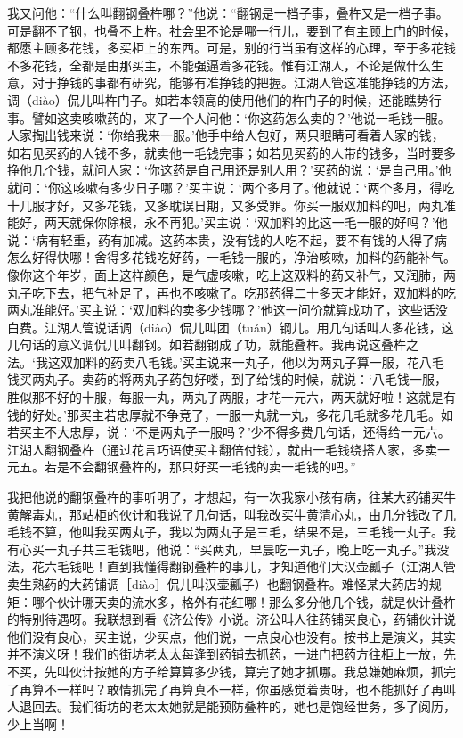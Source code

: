 \documentclass[12pt,UTF8]{ctexbook}
\begin{document}
我又问他：“什么叫翻钢叠杵哪？”他说：“翻钢是一档子事，叠杵又是一档子事。可是翻不了钢，也叠不上杵。社会里不论是哪一行儿，要到了有主顾上门的时候，都愿主顾多花钱，多买柜上的东西。可是，别的行当虽有这样的心理，至于多花钱不多花钱，全都是由那买主，不能强逼着多花钱。惟有江湖人，不论是做什么生意，对于挣钱的事都有研究，能够有准挣钱的把握。江湖人管这准能挣钱的方法，调（diào）侃儿叫杵门子。如若本领高的使用他们的杵门子的时候，还能瞧势行事。譬如这卖咳嗽药的，来了一个人问他：‘你这药怎么卖的？’他说一毛钱一服。人家掏出钱来说：‘你给我来一服。’他手中给人包好，两只眼睛可看着人家的钱，如若见买药的人钱不多，就卖他一毛钱完事；如若见买药的人带的钱多，当时要多挣他几个钱，就问人家：‘你这药是自己用还是别人用？’买药的说：‘是自己用。’他就问：‘你这咳嗽有多少日子哪？’买主说：‘两个多月了。’他就说：‘两个多月，得吃十几服才好，又多花钱，又多耽误日期，又多受罪。你买一服双加料的吧，两丸准能好，两天就保你除根，永不再犯。’买主说：‘双加料的比这一毛一服的好吗？’他说：‘病有轻重，药有加减。这药本贵，没有钱的人吃不起，要不有钱的人得了病怎么好得快哪！舍得多花钱吃好药，一毛钱一服的，净治咳嗽，加料的药能补气。像你这个年岁，面上这样颜色，是气虚咳嗽，吃上这双料的药又补气，又润肺，两丸子吃下去，把气补足了，再也不咳嗽了。吃那药得二十多天才能好，双加料的吃两丸准能好。’买主说：‘双加料的卖多少钱哪？’他这一问价就算成功了，这些话没白费。江湖人管说话调（diào）侃儿叫团（tuǎn）钢儿。用几句话叫人多花钱，这几句话的意义调侃儿叫翻钢。如若翻钢成了功，就能叠杵。我再说这叠杵之法。‘我这双加料的药卖八毛钱。’买主说来一丸子，他以为两丸子算一服，花八毛钱买两丸子。卖药的将两丸子药包好喽，到了给钱的时候，就说：‘八毛钱一服，胜似那不好的十服，每服一丸，两丸子两服，才花一元六，两天就好啦！这就是有钱的好处。’那买主若忠厚就不争竞了，一服一丸就一丸，多花几毛就多花几毛。如若买主不大忠厚，说：‘不是两丸子一服吗？’少不得多费几句话，还得给一元六。江湖人翻钢叠杵（通过花言巧语使买主翻倍付钱），就由一毛钱绕搭人家，多卖一元五。若是不会翻钢叠杵的，那只好买一毛钱的卖一毛钱的吧。”

我把他说的翻钢叠杵的事听明了，才想起，有一次我家小孩有病，往某大药铺买牛黄解毒丸，那站柜的伙计和我说了几句话，叫我改买牛黄清心丸，由几分钱改了几毛钱不算，他叫我买两丸子，我以为两丸子是三毛，结果不是，三毛钱一丸子。我有心买一丸子共三毛钱吧，他说：“买两丸，早晨吃一丸子，晚上吃一丸子。”我没法，花六毛钱吧！直到我懂得翻钢叠杵的事儿，才知道他们大汉壶瓤子（江湖人管卖生熟药的大药铺调［diào］侃儿叫汉壶瓤子）也翻钢叠杵。难怪某大药店的规矩：哪个伙计哪天卖的流水多，格外有花红哪！那么多分他几个钱，就是伙计叠杵的特别待遇呀。我联想到看《济公传》小说。济公叫人往药铺买良心，药铺伙计说他们没有良心，买主说，少买点，他们说，一点良心也没有。按书上是演义，其实并不演义呀！我们的街坊老太太每逢到药铺去抓药，一进门把药方往柜上一放，先不买，先叫伙计按她的方子给算算多少钱，算完了她才抓哪。我总嫌她麻烦，抓完了再算不一样吗？敢情抓完了再算真不一样，你虽感觉着贵呀，也不能抓好了再叫人退回去。我们街坊的老太太她就是能预防叠杵的，她也是饱经世务，多了阅历，少上当啊！
\end{document}
